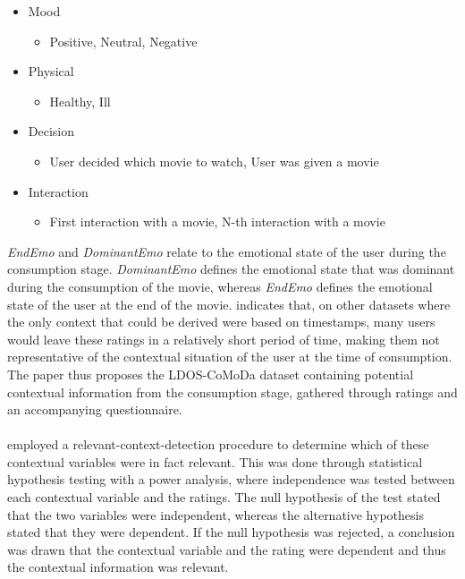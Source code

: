 \begin{itemize}
\begin{itemize}
    \end{itemize}
    \item Mood
    \begin{itemize}
        \item Positive, Neutral, Negative
    \end{itemize}
    \item Physical
    \begin{itemize}
        \item Healthy, Ill
    \end{itemize}
    \item Decision
    \begin{itemize}
        \item User decided which movie to watch, User was given a movie
    \end{itemize}
    \item Interaction
    \begin{itemize}
        \item First interaction with a movie, N-th interaction with a movie
    \end{itemize}
\end{itemize}
\textit{EndEmo} and \textit{DominantEmo} relate to the emotional state of the user during the consumption stage.
\textit{DominantEmo} defines the emotional state that was dominant during the consumption of the movie, whereas \textit{EndEmo} defines the emotional state of the user at the end of the movie\cite{COMODA2013}.
\cite{COMODA2013} indicates that, on other datasets where the only context that could be derived were based on timestamps, many users would leave these ratings in a relatively short period of time, making them not representative of the contextual situation of the user at the time of consumption.
The paper thus proposes the LDOS-CoMoDa dataset containing potential contextual information from the consumption stage, gathered through ratings and an accompanying questionnaire.
\\\\
\cite{COMODA2013} employed a relevant-context-detection procedure to determine which of these contextual variables were in fact relevant.
This was done through statistical hypothesis testing with a power analysis, where independence was tested between each contextual variable and the ratings.
The null hypothesis of the test stated that the two variables were independent, whereas the alternative hypothesis stated that they were dependent.
If the null hypothesis was rejected, a conclusion was drawn that the contextual variable and the rating were dependent and thus the contextual information was relevant.
